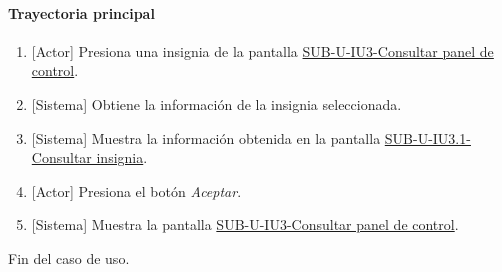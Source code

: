 \paragraph{Trayectoria principal}
	\begin{enumerate}
		\item {[Actor]} Presiona una insignia de la pantalla \hyperref[fig:sub-u-iu3]{SUB-U-IU3-Consultar panel de control}.
		\item {[Sistema]} Obtiene la información de la insignia seleccionada.
		\item {[Sistema]} Muestra la información obtenida en la pantalla \hyperref[fig:sub-u-iu3.1]{SUB-U-IU3.1-Consultar insignia}.
		\item {[Actor]} Presiona el botón \textit{Aceptar}.
		\item {[Sistema]} Muestra la pantalla \hyperref[fig:sub-u-iu3]{SUB-U-IU3-Consultar panel de control}.
	\end{enumerate}
	Fin del caso de uso.

